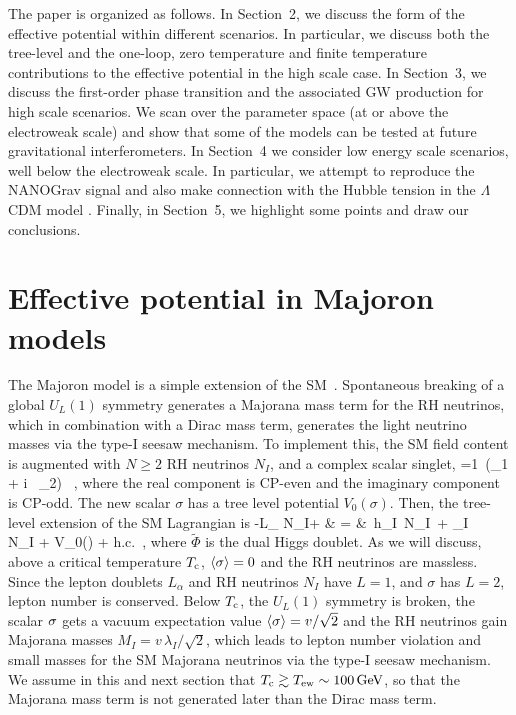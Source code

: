 \documentclass[a4paper,11pt]{article}
\begin{document}
The paper is organized as follows. In Section~2,
we discuss the form of the effective potential within different
scenarios. In particular,  we discuss both the tree-level and the one-loop, zero temperature and  finite temperature contributions to 
the effective potential in the high scale case. %
In Section~3, we discuss the first-order phase transition and the associated 
GW production for high scale scenarios.  We scan over the parameter space (at or above the electroweak scale) and show that some of the models can be tested at future gravitational interferometers. 
In Section~4 we consider low energy scale scenarios, well below the electroweak scale. 
In particular, we attempt to reproduce 
the NANOGrav signal and also make connection with the Hubble tension in the $\Lambda$CDM model .
Finally, in Section~5, we highlight some points and draw our conclusions.

\section{Effective potential in Majoron models} 

The Majoron model is a simple extension of the SM~\cite{Chikashige:1980ui}.
Spontaneous breaking of a global $U_L(1)$ symmetry generates a Majorana mass term for the RH neutrinos,
 which in combination with a  Dirac mass term,
generates the  light neutrino masses via the type-I seesaw mechanism. 
To implement this, the SM field content is augmented with $N \geq 2$ RH neutrinos $N_I$,  
and a complex scalar singlet,
\be
\sigma ={1 \over {}}\,(\s_1 + i \, \s_2) \,  ,
\ee
 where the real component is CP-even and the imaginary component  is CP-odd. 
 The new scalar $\sigma$ has a tree level potential $V_0(\sigma)$. Then, the
 tree-level extension of the SM Lagrangian is
 \bea\label{eq:L_l}
-{\cal L}_ {N_I+\s} & = & 
 \,h_{\a I}\, N_{I}\, \widetilde{\Phi} 
+  {\lambda_{I}}  \, \sigma \,  \, N_{I}
+ V_0(\sigma)
+ {\rm h.c.} \,,
\eea
where $\widetilde{\Phi}$ is the dual Higgs doublet.
As we will discuss, above a critical temperature $T_{\rm c}$, $\langle \sigma \rangle = 0$ and the RH neutrinos are massless.
Since the lepton  doublets $L_\alpha$ and RH neutrinos $N_I$ have $L = 1$, and  $\sigma$ has $L=2$,
lepton number is conserved.  Below $T_{\rm c}$, the $U_L(1)$ symmetry is broken, the scalar $\sigma$ gets a vacuum expectation value  
$\langle \sigma \rangle = v/\sqrt{2}$ and the RH neutrinos gain Majorana masses $M_I = v\, \lambda_I/\sqrt{2}$, 
which leads to lepton number violation and  small masses for the SM Majorana neutrinos via the type-I seesaw mechanism. 
We assume in this and next section that $T_{\rm c} \gtrsim T_{\rm ew} \sim 100 \, {\rm GeV}$, so that 
the Majorana mass term is not generated later than the Dirac mass term.
\end{document}
